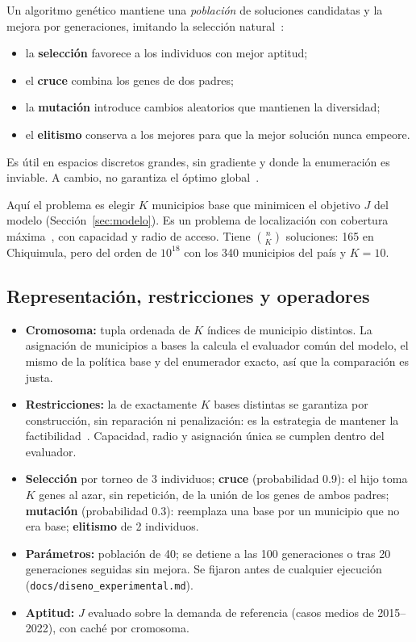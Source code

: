 \documentclass[11pt,letterpaper]{article}
\newcommand{\cod}[1]{\texttt{#1}}
\begin{document}
Un algoritmo genético mantiene una \emph{población} de soluciones candidatas y la mejora por generaciones, imitando la selección natural~\cite{holland,goldberg}:
\begin{itemize}[nosep]
  \item la \textbf{selección} favorece a los individuos con mejor aptitud;
  \item el \textbf{cruce} combina los genes de dos padres;
  \item la \textbf{mutación} introduce cambios aleatorios que mantienen la diversidad;
  \item el \textbf{elitismo} conserva a los mejores para que la mejor solución nunca empeore.
\end{itemize}
Es útil en espacios discretos grandes, sin gradiente y donde la enumeración es inviable. A cambio, no garantiza el óptimo global~\cite{eiben}.

Aquí el problema es elegir $K$ municipios base que minimicen el objetivo $J$ del modelo (Sección~\ref{sec:modelo}). Es un problema de localización con cobertura máxima~\cite{church}, con capacidad y radio de acceso. Tiene $\binom{n}{K}$ soluciones: 165 en Chiquimula, pero del orden de $10^{18}$ con los 340 municipios del país y $K=10$.

\subsection{Representación, restricciones y operadores}

\begin{itemize}
  \item \textbf{Cromosoma:} tupla ordenada de $K$ índices de municipio distintos. La asignación de municipios a bases la calcula el evaluador común del modelo, el mismo de la política base y del enumerador exacto, así que la comparación es justa.
  \item \textbf{Restricciones:} la de exactamente $K$ bases distintas se garantiza por construcción, sin reparación ni penalización: es la estrategia de mantener la factibilidad~\cite{deb2000}. Capacidad, radio y asignación única se cumplen dentro del evaluador.
  \item \textbf{Selección} por torneo de 3 individuos; \textbf{cruce} (probabilidad 0.9): el hijo toma $K$ genes al azar, sin repetición, de la unión de los genes de ambos padres; \textbf{mutación} (probabilidad 0.3): reemplaza una base por un municipio que no era base; \textbf{elitismo} de 2 individuos.
  \item \textbf{Parámetros:} población de 40; se detiene a las 100 generaciones o tras 20 generaciones seguidas sin mejora. Se fijaron antes de cualquier ejecución (\cod{docs/diseno\_experimental.md}).
  \item \textbf{Aptitud:} $J$ evaluado sobre la demanda de referencia (casos medios de 2015--2022), con caché por cromosoma.
\end{itemize}
\end{document}
